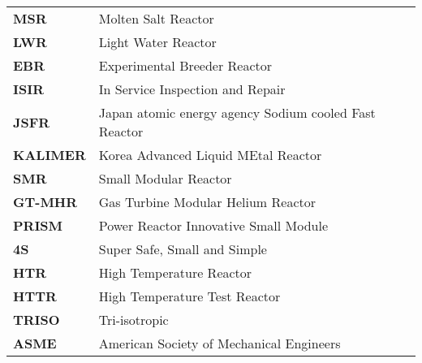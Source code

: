 \documentclass[journal]{IEEEtran}
\begin{document}
\begin{table}[!ht]
\begin{tabular}{l l}
\textbf{MSR}& Molten Salt Reactor \\

\textbf{LWR}& Light Water Reactor\\

\textbf{EBR}&Experimental Breeder Reactor\\

\textbf{ISIR}&In Service Inspection and Repair\\

\textbf{JSFR}&Japan atomic energy agency Sodium cooled Fast Reactor\\

\textbf{KALIMER}&Korea Advanced Liquid MEtal Reactor\\

\textbf{SMR}&Small Modular Reactor\\

\textbf{GT-MHR}&Gas Turbine Modular Helium Reactor\\

\textbf{PRISM}&Power Reactor Innovative Small Module\\

\textbf{4S}&Super Safe, Small and Simple\\

\textbf{HTR}&High Temperature Reactor\\

\textbf{HTTR}&High Temperature Test Reactor\\

\textbf{TRISO}&Tri-isotropic\\

\textbf{ASME}&American Society of Mechanical Engineers\\

\end{tabular}
\end{table}
%
%
%
%
%
%
%
%
%
%
%
%
%
%
%
%
\end{document}
